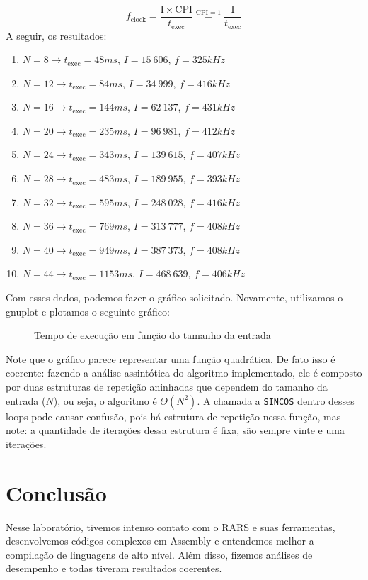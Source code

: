 \documentclass[a4paper,12pt]{article}
\newcommand{\cod}[1]{\texttt{#1}}
\begin{document}
\[
f_{\mathrm{clock}} = \frac{\mathrm{I} \times \mathrm{CPI}}{t_{\mathrm{exec}}} \overset{\mathrm{CPI}=1}{=} \frac{\mathrm{I}}{t_{\mathrm{exec}}}
\]
A seguir, os resultados:
\begin{enumerate}[label=\alph*), itemsep=0pt]
    \item $N=8 \to t_{\mathrm{exec}} = 48 ms$, $I = 15\ 606$, $f = 325 kHz$
    \item $N=12 \to t_{\mathrm{exec}} = 84 ms$, $I = 34\ 999$, $f = 416 kHz$
    \item $N=16 \to t_{\mathrm{exec}} = 144 ms$, $I = 62\ 137$, $f = 431 kHz$
    \item $N=20 \to t_{\mathrm{exec}} = 235 ms$, $I = 96\ 981$, $f = 412 kHz$
    \item $N=24 \to t_{\mathrm{exec}} = 343 ms$, $I = 139\ 615$, $f = 407 kHz$
    \item $N=28 \to t_{\mathrm{exec}} = 483 ms$, $I = 189\ 955$, $f = 393 kHz$
    \item $N=32 \to t_{\mathrm{exec}} = 595 ms$, $I = 248\ 028$, $f = 416 kHz$
    \item $N=36 \to t_{\mathrm{exec}} = 769 ms$, $I = 313\ 777$, $f = 408 kHz$
    \item $N=40 \to t_{\mathrm{exec}} = 949 ms$, $I = 387\ 373$, $f = 408 kHz$
    \item $N=44 \to t_{\mathrm{exec}} = 1153 ms$, $I = 468\ 639$, $f = 406 kHz$
\end{enumerate}

Com esses dados, podemos fazer o gráfico solicitado. Novamente, utilizamos o gnuplot e plotamos o seguinte gráfico:

\begin{figure}[H]
    \centering
    
    \vspace{-30pt}
    \caption{Tempo de execução em função do tamanho da entrada}
\end{figure}

Note que o gráfico parece representar uma função quadrática. De fato isso é coerente: fazendo a análise assintótica do algoritmo implementado, ele é composto por duas estruturas de repetição aninhadas que dependem do tamanho da entrada ($N$), ou seja, o algoritmo é $\Theta(N^2)$. A chamada a \cod{SINCOS} dentro desses loops pode causar confusão, pois há estrutura de repetição nessa função, mas note: a quantidade de iterações dessa estrutura é fixa, são sempre vinte e uma iterações.
    
\section{Conclusão}
Nesse laboratório, tivemos intenso contato com o RARS e suas ferramentas, desenvolvemos códigos complexos em Assembly e entendemos melhor a compilação de linguagens de alto nível. Além disso, fizemos análises de desempenho e todas tiveram resultados coerentes.
\end{document}
